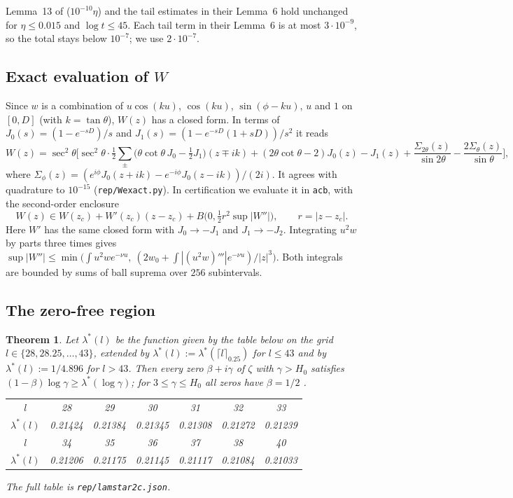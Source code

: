 \documentclass[11pt]{amsart}
\numberwithin{equation}{section}
\newtheorem{theorem}{Theorem}[section]
\theoremstyle{definition}
\theoremstyle{remark}
\newcommand{\code}[1]{\texttt{#1}}
\begin{document}
Lemma~13 of \cite{BTY} ($10^{-10}\eta$) and the tail estimates in their Lemma~6 hold unchanged for $\eta \le 0.015$ and $\log t \le 45$.
Each tail term in their Lemma~6 is at most $3\cdot 10^{-9}$, so the total stays below $10^{-7}$; we use $2\cdot10^{-7}$.

\subsection{Exact evaluation of $W$}
Since $w$ is a combination of $u\cos(ku)$, $\cos(ku)$, $\sin(\phi-ku)$, $u$ and $1$ on $[0,D]$ (with $k = \tan\theta$), $W(z)$ has a closed form.
In terms of $J_0(s) = (1-e^{-sD})/s$ and $J_1(s) = (1 - e^{-sD}(1+sD))/s^2$ it reads
\[
W(z) = \sec^2\theta\Big[\sec^2\theta\cdot\tfrac12\sum_\pm\big(\theta\cot\theta\, J_0 - \tfrac12J_1\big)(z\mp ik) + (2\theta\cot\theta-2)J_0(z) - J_1(z) + \frac{\Sigma_{2\theta}(z)}{\sin2\theta} - \frac{2\Sigma_\theta(z)}{\sin\theta}\Big],
\]
where $\Sigma_\phi(z) = (e^{i\phi}J_0(z+ik) - e^{-i\phi}J_0(z-ik))/(2i)$.
It agrees with quadrature to $10^{-15}$ (\code{rep/Wexact.py}).
In certification we evaluate it in \code{acb}, with the second-order enclosure
\[
W(z) \in W(z_c) + W'(z_c)(z - z_c) + B\big(0, \tfrac12 r^2\sup|W''|\big), \qquad r = |z-z_c| .
\]
Here $W'$ has the same closed form with $J_0\to-J_1$ and $J_1\to-J_2$.
Integrating $u^2w$ by parts three times gives $\sup|W''| \le \min\big(\int u^2we^{-\nu u},\ (2w_0 + \int|(u^2w)'''|e^{-\nu u})/|z|^3\big)$.
Both integrals are bounded by sums of ball suprema over $256$ subintervals.

\subsection{The zero-free region}
\begin{theorem}\label{thm:H}
Let $\lambda^*(l)$ be the function given by the table below on the grid $l \in \{28, 28.25, \dots, 43\}$, extended by $\lambda^*(l) := \lambda^*(\lceil l\rceil_{0.25})$ for $l \le 43$ and by $\lambda^*(l) := 1/4.896$ for $l > 43$.
Then every zero $\beta+i\gamma$ of $\zeta$ with $\gamma > H_0$ satisfies $(1-\beta)\log\gamma \ge \lambda^*(\log\gamma)$; for $3\le\gamma\le H_0$ all zeros have $\beta = 1/2$ \cite{PlattTrudgianRH}.
\begin{center}\small
\begin{tabular}{c|cccccc}
\toprule
$l$ & 28 & 29 & 30 & 31 & 32 & 33\\
$\lambda^*(l)$ & 0.21424 & 0.21384 & 0.21345 & 0.21308 & 0.21272 & 0.21239\\
\midrule
$l$ & 34 & 35 & 36 & 37 & 38 & 40\\
$\lambda^*(l)$ & 0.21206 & 0.21175 & 0.21145 & 0.21117 & 0.21084 & 0.21033\\
\bottomrule
\end{tabular}
\end{center}
The full table is \code{rep/lamstar2c.json}.
\end{theorem}
\end{document}
